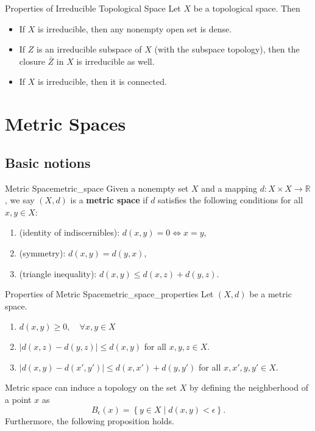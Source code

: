 \documentclass{report}
\begin{document}
\begin{proposition}{Properties of Irreducible Topological Space}{}
	Let $X$ be a topological space. Then
	\begin{itemize}
		\item If $X$ is irreducible, then any nonempty open set is dense.
		\item If $Z$ is an irreducible subspace of $X$ (with the subspace topology), then the closure $\bar{Z}$ in $X$ is irreducible as well.
		\item If $X$ is irreducible, then it is connected.
	\end{itemize}
\end{proposition}


\section{Metric Spaces}
\subsection{Basic notions}
\begin{definition}{Metric Space}{metric_space}
	Given a nonempty set $X$ and a mapping $d:X\times X\to \mathbb{R}$, we say $(X,d)$ is a \textbf{metric space} if $d$ satisfies the following conditions for all $x,y\in X$:
	\begin{enumerate}
		\item (identity of indiscernibles): $d(x,y)=0\iff x=y$,
		\item (symmetry): $d(x,y)=d(y,x)$,
		\item (triangle inequality): $d(x,y)\le d(x,z)+d(y,z)$.
	\end{enumerate}
\end{definition}
\begin{proposition}{Properties of Metric Space}{metric_space_properties}
	Let $(X,d)$ be a metric space.
	\begin{enumerate}
		\item $d(x,y)\ge 0,\quad\forall x,y\in X$
		\item $|d(x,z)-d(y,z)|\le d(x,y)$ for all $x,y,z\in X$.
		\item $|d(x,y)-d(x',y')|\le d(x,x')+d(y,y')$ for all $x,x',y,y'\in X$.
	\end{enumerate}
\end{proposition}
Metric space can induce a topology on the set $X$ by defining the neighberhood of a point $x$ as
\[
	B_\epsilon(x)=\left\{y\in X\mid d(x,y)<\epsilon \right\}.
\]
Furthermore, the following proposition holds.
\end{document}
